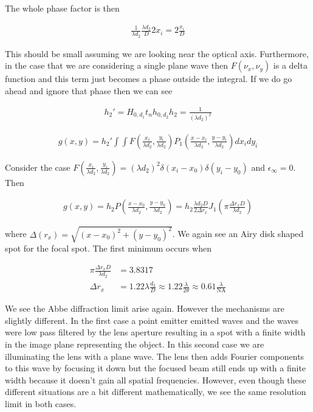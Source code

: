 \documentclass[12pt]{article}
\begin{document}
The whole phase factor is then

\begin{align}
\frac{1}{\lambda d_2} \frac{\lambda d_2}{D} 2x_i = 2\frac{x_i}{D}
\end{align}

This should be small assuming we are looking near the optical axis. Furthermore, in the case that we are considering a single plane wave then $F(\nu_x,\nu_y)$ is  a delta function and this term just becomes a phase outside the integral. If we do go ahead and ignore that phase then we can see

\begin{align}
h_2' = H_{0,d_1}t_nh_{0,d_2}
h_2 = \frac{1}{(\lambda d_2)^2}
\end{align}

\begin{align}
g(x,y) = h_2'\int \int F\left(\frac{x_i}{\lambda d_2},\frac{y_i}{\lambda d_2}\right) P_1\left(\frac{x-x_i}{\lambda d_2},\frac{y-y_i}{\lambda d_2}\right)dx_idy_i
\end{align}

Consider the case $F\left(\frac{x_i}{\lambda d_2},\frac{y_i}{\lambda d_2}\right) = (\lambda d_2)^2 \delta(x_i-x_0)\delta(y_i-y_0)$ and $\epsilon_{\infty} = 0$. Then

\begin{align}
g(x,y) = h_2 P\left(\frac{x-x_0}{\lambda d_2}, \frac{y-y_0}{\lambda d_2}\right) = h_2 \frac{\lambda d_2 D}{2\Delta r_x}J_1\left(\pi \frac{\Delta r_x D}{\lambda d_2}\right)
\end{align}

where $\Delta(r_x) = \sqrt{(x-x_0)^2+(y-y_0)^2}$.
We again see an Airy disk shaped spot for the focal spot. The first minimum occurs when

\begin{align}
\pi \frac{\Delta r_x D}{\lambda d_2} &= 3.8317\\
\Delta r_x & = 1.22 \lambda \frac{d_2}{D} \approx 1.22 \frac{\lambda}{2\theta} \approx 0.61 \frac{\lambda}{\text{NA}}
\end{align}

We see the Abbe diffraction limit arise again. However the mechanisms are slightly different. In the first case a point emitter emitted waves and the waves were low pass filtered by the lens aperture resulting in a spot with a finite width in the image plane representing the object. In this second case we are illuminating the lens with a plane wave. The lens then adds Fourier components to this wave by focusing it down but the focused beam still ends up with a finite width because it doesn't gain all spatial frequencies. However, even though these different situations are a bit different mathematically, we see the same resolution limit in both cases.
\end{document}

